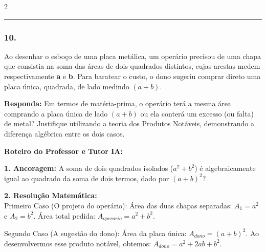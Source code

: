 \begin{multicols*}{2}
\par\vspace{\espacoQuestao}

\noindent\textcolor{CorLinha}{\rule{\linewidth}{0.5pt}}
\par\vspace{\espacoPreQuestao}
\subsubsection*{10.} 
\begin{enunciadoLiteral}
Ao desenhar o esboço de uma placa metálica, um operário precisou de uma chapa que consistia na soma das áreas de dois quadrados distintos, cujas arestas medem respectivamente \textbf{a} e \textbf{b}. Para baratear o custo, o dono sugeriu comprar direto uma placa única, quadrada, de lado medindo $ (a + b) $.

\begin{boxresponda}
\textbf{Responda:} Em termos de matéria-prima, o operário terá a mesma área comprando a placa única de lado $ (a + b) $ ou ela conterá um excesso (ou falta) de metal? Justifique utilizando a teoria dos Produtos Notáveis, demonstrando a diferença algébrica entre os dois casos.
\end{boxresponda}
\end{enunciadoLiteral}

\ifgabarito
    \begin{tcolorbox}[colback=CorTitUm!5, colframe=CorTitUm, boxrule=1pt, arc=4pt, left=6pt, right=6pt, top=6pt, bottom=6pt]
    \small\textbf{\textcolor{CorTitUm}{Roteiro do Professor e Tutor IA:}}\par\vspace{0.1cm}
    \color{CinzaEscuro}
    \textbf{1. Ancoragem:} A soma de dois quadrados isolados ($ a^2 + b^2 $) é algebraicamente igual ao quadrado da soma de dois termos, dado por $ (a+b)^2 $?\par\vspace{0.1cm}
    \textbf{2. Resolução Matemática:}\\
    Primeiro Caso (O projeto do operário):
    Área das duas chapas separadas: $ A_1 = a^2 $ e $ A_2 = b^2 $.
    Área total pedida: $ A_{operario} = a^2 + b^2 $.
    
    Segundo Caso (A sugestão do dono):
    Área da placa única: $ A_{dono} = (a + b)^2 $.
    Ao desenvolvermos esse produto notável, obtemos:
    $ A_{dono} = a^2 + 2ab + b^2 $.
    

\end{tcolorbox}
\end{multicols*}
